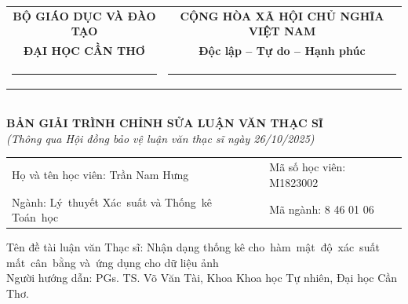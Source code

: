 \documentclass[a4paper,oneside]{article} %
\newcommand{\nametitle}{Nhận dạng thống kê cho~hàm~mật~độ~xác~suất mất~cân~bằng và~ứng dụng cho dữ liệu ảnh}
\newcommand{\MainAdvisor}{PGs. TS. Võ Văn Tài}
\newcommand{\student}{Trần Nam Hưng}
\newcommand{\studentid}{M1823002}
\newcommand{\major}{Lý~thuyết Xác~suất và Thống~kê Toán~học}
\begin{document}
\begin{center}
	\begin{tabular}{cc}
		\bf   BỘ GIÁO DỤC VÀ ĐÀO TẠO     &   \bf  CỘNG HÒA XÃ HỘI CHỦ NGHĨA VIỆT NAM\\
 \bf ĐẠI HỌC CẦN THƠ           &     \bf   Độc lập -- Tự do -- Hạnh phúc\\
 \rule{4cm}{1pt} &  \rule{4cm}{1pt}\\
\end{tabular}\\
\vspace{20pt}
{\fontsize{14pt}{12pt}\selectfont\bf BẢN GIẢI TRÌNH CHỈNH SỬA LUẬN VĂN THẠC SĨ}\\
{\it (Thông qua Hội đồng bảo vệ luận văn thạc sĩ ngày 26/10/2025)}\\
\vspace{20pt}
\end{center}
	\begin{tabular*}{\columnwidth}{@{\extracolsep\fill}ll@{\extracolsep\fill}}
	Họ và tên học viên: \selectfont\MakeUppercase\student &                      Mã số học viên: \studentid\\
	Ngành: \major                       &                       Mã ngành: 8 46 01 06\\
\end{tabular*}
	Tên đề tài luận văn Thạc sĩ: \nametitle \\
	Người hướng dẫn: \MainAdvisor, Khoa Khoa học Tự nhiên, Đại học Cần Thơ.
	
\end{document}
